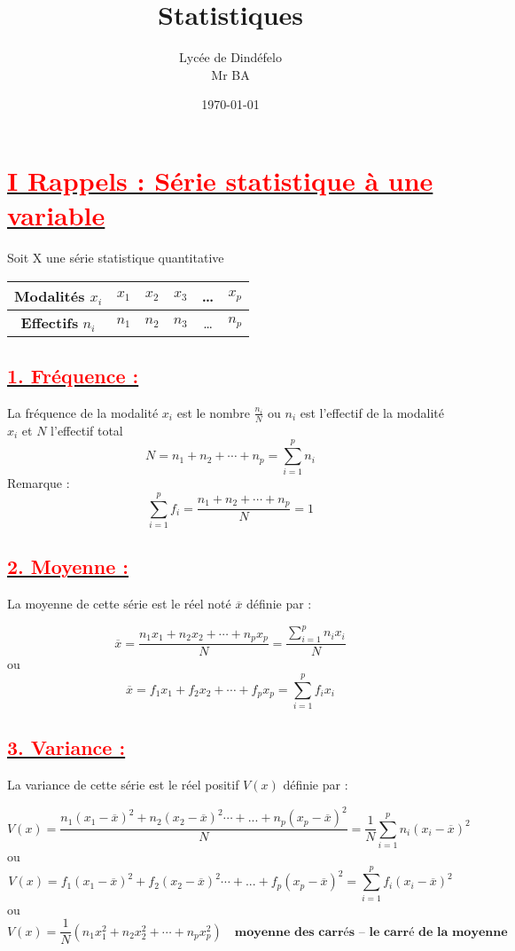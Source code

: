 \documentclass[12pt]{article}
\author{Lycée de Dindéfelo\\Mr BA}
\title{\textbf{Statistiques}}
\date{\today}
\begin{document}
\maketitle
\newpage
\section*{\underline{\textbf{\textcolor{red}{I Rappels : Série statistique à une variable}}}}
Soit X une série statistique quantitative
\begin{table}[h]
\centering
\begin{tabular}{|c|c|c|c|c|c|}
\hline
\textbf{Modalités} \( x_i \) & \( x_1 \) & \( x_2 \) & \( x_3 \) & \ldots & \( x_p \) \\
\hline
\textbf{Effectifs} \( n_i \) & \( n_1 \) & \( n_2 \) & \( n_3 \) & \ldots & \( n_p \) \\
\hline
\end{tabular}
\end{table}
\subsection*{\underline{\textbf{\textcolor{red}{1. Fréquence :}}}}
La fréquence de la modalité $x_{i}$ est le nombre $\frac{n_{i}}{N}$ ou $n_{i}$ est l’effectif de la modalité $x_{i}$ et $N$ l’effectif total \[N=n_{1}+n_{2}+\cdots+n_{p}=\sum_{i=1}^{p}n_{i}\] 
Remarque : \[\sum_{i=1}^{p}f_{i}=\frac{n_{1}+n_{2}+\cdots+n_{p}}{N}=1\]
\subsection*{\underline{\textbf{\textcolor{red}{2.	Moyenne :}}}}
La moyenne de cette série est le réel noté  $\overline{x}$  définie par : 

\[\overline{x}=\frac{n_{1}x_{1}+n_{2}x_{2}+\cdots+n_{p}x_{p}}{N}=\frac{\sum_{i=1}^{p}n_{i}x_{i}}{N}\]
ou \[\overline{x}=f_{1}x_{1}+f_{2}x_{2}+\cdots+f_{p}x_{p}=\sum_{i=1}^{p}f_{i}x_{i}\]
\subsection*{\underline{\textbf{\textcolor{red}{3.	Variance :}}}}
La variance de cette série est le réel positif $V(x)$ définie par :

\[V(x)=\frac{n_{1}(x_{1}-\overline{x})^{2}+n_{2}(x_{2}-\overline{x})^{2}\cdots+...+ 
n_{p}(x_{p}-\overline{x})^{2}}{N}=\frac{1}{N}\sum_{i=1}^{p}n_{i}(x_{i}-\overline{x})^{2} \]
ou
\[V(x)=f_{1}(x_{1}-\overline{x})^{2}+f_{2}(x_{2}-\overline{x})^{2}\cdots+...+ 
f_{p}(x_{p}-\overline{x})^{2}=\sum_{i=1}^{p}f_{i}(x_{i}-\overline{x})^{2}\]
ou
\[V(x)=\frac{1}{N}(n_{1}x_{1}^{2}+n_{2}x_{2}^{2}+\cdots+n_{p}x_{p}^{2})\quad\textbf{moyenne des carrés – le carré de la moyenne}\]
\end{document}
